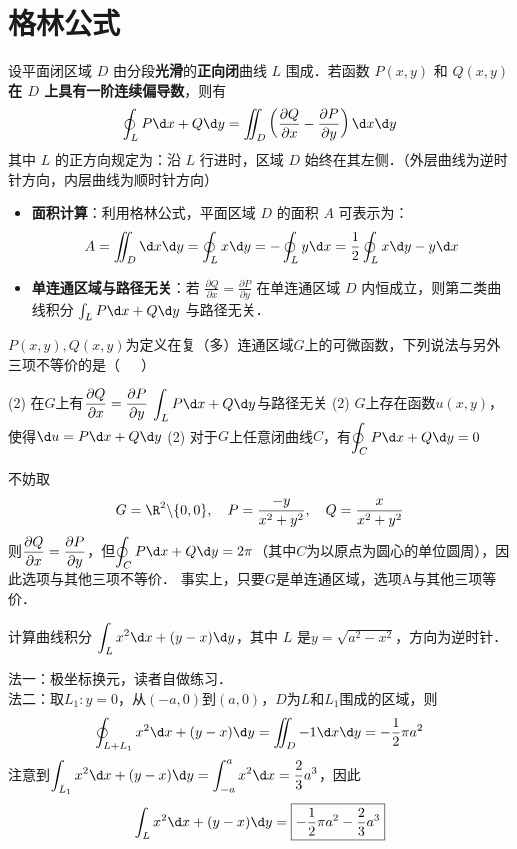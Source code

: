 \documentclass[12pt, a4paper, oneside, UTF8]{ctexbook}
\begin{document}
\section{格林公式}
\begin{theorem}
    设平面闭区域 $D$ 由分段\textbf{光滑}的\textbf{正向闭}曲线 $L$ 围成．若函数 $P(x,y)$ 和 $Q(x,y)$ \textbf{在 $D$ 上具有一阶连续偏导数}，则有
    \[ \oint_L P \d x + Q \d y = \iint_D \left( \frac{\partial Q}{\partial x} - \frac{\partial P}{\partial y} \right) \d x \d y \]
    其中 $L$ 的正方向规定为：沿 $L$ 行进时，区域 $D$ 始终在其左侧．（外层曲线为逆时针方向，内层曲线为顺时针方向）
\end{theorem}
\begin{itemize}
    \item \textbf{面积计算}：利用格林公式，平面区域 $D$ 的面积 $A$ 可表示为：
    \[ A = \iint_D \d x \d y = \oint_L x \d y = -\oint_L y \d x = \frac{1}{2} \oint_L x \d y - y \d x \]
    \item \textbf{单连通区域与路径无关}：若 $\frac{\partial Q}{\partial x} = \frac{\partial P}{\partial y}$ 在单连通区域 $D$ 内恒成立，则第二类曲线积分 $\int_L P \d x + Q \d y$ 与路径无关．
\end{itemize}
\begin{example}
    $P(x,y), Q(x,y)$为定义在复（多）连通区域$G$上的可微函数，下列说法与另外三项不等价的是（~~~）
    \begin{tasks}[style = itemize,label=\Alph*.](2)
        \task 在$G$上有$\displaystyle\pdv{Q}{x}=\pdv{P}{y}$
        \task $\displaystyle\int_L P\d x+Q\d y$与路径无关
        \task*(2) $G$上存在函数$u(x,y)$，使得$\d u=P\d x+Q\d y$
        \task*(2) 对于$G$上任意闭曲线$C$，有$\displaystyle\oint_C P\d x+Q\d y=0$
    \end{tasks}
\end{example}
\begin{solution}
    不妨取
    \[G=\R^2\backslash\{0,0\},\quad P=\frac{-y}{x^2+y^2},\quad Q=\frac{x}{x^2+y^2}\]
    则$\displaystyle\pdv{Q}{x}=\pdv{P}{y}$，但$\displaystyle\oint_C P\d x+Q\d y=2\pi$（其中$C$为以原点为圆心的单位圆周），因此选项与其他三项不等价．
    事实上，只要$G$是单连通区域，选项A与其他三项等价．
\end{solution}
\begin{example}
    计算曲线积分 $\displaystyle\int_L x^2\d x+(y-x) \d y$，其中 $L$ 是$y=\sqrt{a^2-x^2}$，方向为逆时针．
\end{example}
\begin{solution}
    法一：极坐标换元，读者自做练习．\\
    法二：取$L_1:y=0$，从$(-a,0)$到$(a,0)$，$D$为$L$和$L_1$围成的区域，则
    \[\oint_{L+L_1} x^2\d x+(y-x) \d y = \iint_D -1\d x \d y = -\frac{1}{2}\pi a^2\]
    注意到$\displaystyle\int_{L_1} x^2\d x+(y-x) \d y = \int_{-a}^{a} x^2 \d x = \frac{2}{3}a^3$，因此
    \[\int_L x^2\d x+(y-x) \d y = \boxed{-\frac{1}{2}\pi a^2 - \frac{2}{3}a^3}\]
\end{solution}
\end{document}
